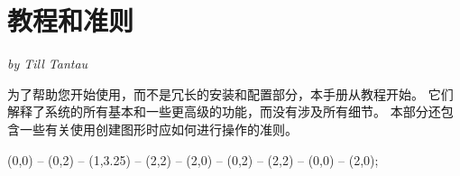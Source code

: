 \clearpage


\part{教程和准则}

{\Large \emph{by Till Tantau}}

\bigskip


\noindent 为了帮助您开始使用\tikzname ，而不是冗长的安装和配置部分，本手册从教程开始。 它们解释了系统的所有基本和一些更高级的功能，而没有涉及所有细节。 本部分还包含一些有关使用\tikzname 创建图形时应如何进行操作的准则。

\vskip3cm

\begin{codeexample}[graphic=white,width=0pt]
\tikz \draw[thick,rounded corners=8pt]
  (0,0) -- (0,2) -- (1,3.25) -- (2,2) -- (2,0) -- (0,2) -- (2,2) -- (0,0) -- (2,0);
\end{codeexample}

\clearpage






